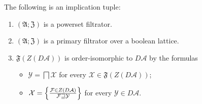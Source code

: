 \begin{thm}
  The following is an implication tuple:
  \begin{enumerate}
    \item \label{fzda-pow} $(\mathfrak{A}; \mathfrak{Z})$ is a powerset filtrator.

    \item \label{fzda-bool} $(\mathfrak{A}; \mathfrak{Z})$ is a primary filtrator over a boolean
    lattice.

    \item \label{fzda-res} $\mathfrak{F} (Z (D \mathcal{A}))$ is order-isomorphic to $D
    \mathcal{A}$ by the formulas
    \begin{itemize}
      \item $\mathcal{Y} = \bigsqcap \mathcal{X}$ for every $\mathcal{X} \in
      \mathfrak{F} (Z (D \mathcal{A}))$;

      \item $\mathcal{X} = \left\{ \frac{ \mathcal{F} \in Z (D \mathcal{A})
      }{ \mathcal{F} \sqsupseteq \mathcal{Y}
      }\right\}$ for every $\mathcal{Y} \in D \mathcal{A}$.
    \end{itemize}
  \end{enumerate}
\end{thm}


